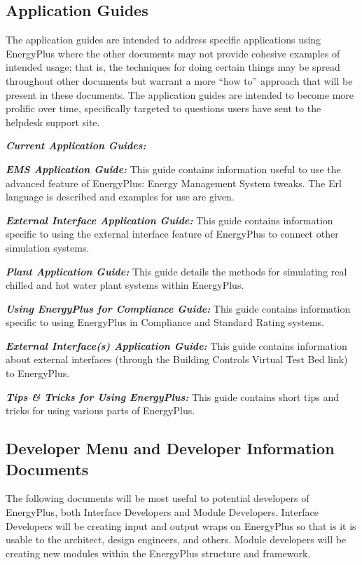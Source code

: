 \subsection{Application Guides}\label{application-guides}

The application guides are intended to address specific applications using EnergyPlus where the other documents may not provide cohesive examples of intended usage; that is, the techniques for doing certain things may be spread throughout other documents but warrant a more ``how to'' approach that will be present in these documents. The application guides are intended to become more prolific over time, specifically targeted to questions users have sent to the helpdesk support site.

\textbf{\emph{Current Application Guides:}}

\textbf{\emph{EMS Application Guide:}} This guide contains information useful to use the advanced feature of EnergyPlus: Energy Management System tweaks. The Erl language is described and examples for use are given.

\textbf{\emph{External Interface Application Guide:}} This guide contains information specific to using the external interface feature of EnergyPlus to connect other simulation systems.

\textbf{\emph{Plant Application Guide:}} This guide details the methods for simulating real chilled and hot water plant systems within EnergyPlus.

\textbf{\emph{Using EnergyPlus for Compliance Guide:}} This guide contains information specific to using EnergyPlus in Compliance and Standard Rating systems.

\textbf{\emph{External Interface(s) Application Guide:}} This guide contains information about external interfaces (through the Building Controls Virtual Test Bed link) to EnergyPlus.

\textbf{\emph{Tips \& Tricks for Using EnergyPlus:}} This guide contains short tips and tricks for using various parts of EnergyPlus.

\subsection{Developer Menu and Developer Information Documents}\label{developer-menu-and-developer-information-documents}

The following documents will be most useful to potential developers of EnergyPlus, both Interface Developers and Module Developers. Interface Developers will be creating input and output wraps on EnergyPlus so that is it is usable to the architect, design engineers, and others. Module developers will be creating new modules within the EnergyPlus structure and framework.

